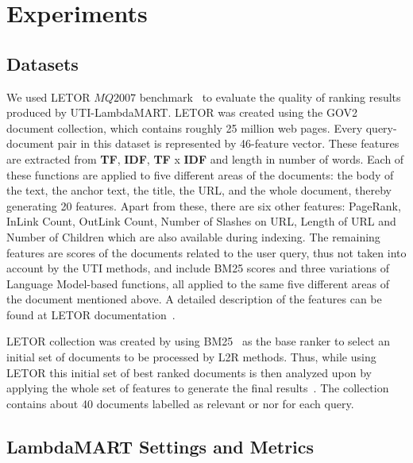 \documentclass[preprint,review,10pt,3p]{elsarticle}
\begin{document}
\section{Experiments}
\label{experiments}


\subsection{Datasets}
\label{sec:datasets}
We used LETOR $MQ2007$ benchmark~\cite{liu2007letor} to evaluate the quality of ranking results produced by UTI-LambdaMART. LETOR  was  created using  the GOV2 document collection, which contains roughly 25 million web pages.  Every query-document pair in this dataset is represented by 46-feature vector. These features are extracted from \textbf{TF}, \textbf{IDF}, \textbf{TF} x \textbf{IDF} and length in number of words. Each of these functions are applied to five different areas of the documents: the body of the text, the anchor text, the title, the URL, and the whole document, thereby generating 20 features. Apart from these, there are six other features: PageRank, InLink Count, OutLink Count, Number of Slashes on URL, Length of URL and Number of Children which are also available during indexing. The remaining features are scores of the documents related to the user query, thus not taken into account by the UTI methods, and include BM25  scores and three variations of Language Model-based functions, all applied to the same five different areas of the document mentioned above.  A detailed description of the features can be found at LETOR documentation~\cite{liu2007letor}. 

LETOR collection was created by using BM25~\cite{robertson1994some} as the base ranker to select an initial set of documents to be processed by L2R methods. Thus, while using LETOR this initial set of best ranked documents is then analyzed upon by applying the whole set of features to generate the final results~\cite{cambazoglu2010early}. The collection contains about 40 documents labelled as relevant or nor for each query.


\subsection{LambdaMART Settings and Metrics}
\label{sec:lsett}
\end{document}
